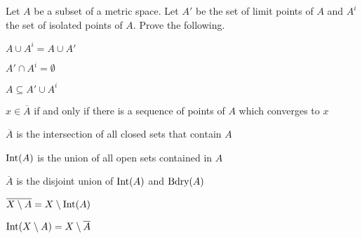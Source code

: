 \item Let $A$ be a subset of a metric space. Let $A'$ be the set of limit points of $A$ and $A^i$ the set of isolated points of $A$. Prove the following.
\ba
\item $A \cup A^i = A \cup A'$
\item $A' \cap A^i = \emptyset$
\item $A \subseteq A' \cup A^i$
\item $x \in \overline{A}$ if and only if there is a sequence of points of $A$ which converges to $x$
\item $\overline{A}$ is the intersection of all closed sets that contain $A$
\item $\text{Int}(A)$ is the union of all open sets contained in $A$
\item $\overline{A}$ is the disjoint union of $\text{Int}(A)$ and $\text{Bdry}(A)$ 
\item $\overline{X \setminus A} = X \setminus \text{Int}(A)$
\item $\text{Int}(X \setminus A) = X \setminus \overline{A}$
\ea

